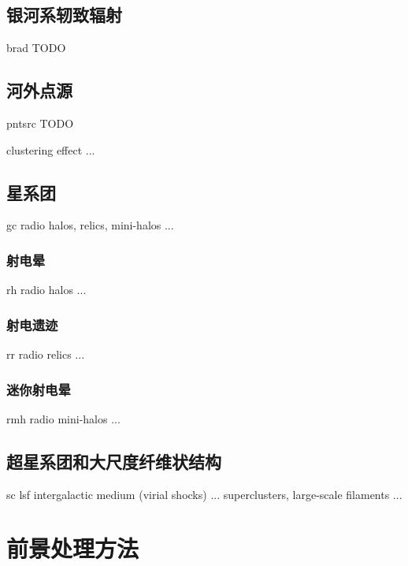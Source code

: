 \subsection{银河系轫致辐射}

\acl{brad}
TODO

\subsection{河外点源}

\acl{pntsrc}
TODO

clustering effect ...

\subsection{星系团}

\acl{gc}
radio halos, relics, mini-halos ...

\subsubsection{射电晕}

\acl{rh}
radio halos ...

\subsubsection{射电遗迹}

\acl{rr}
radio relics ...

\subsubsection{迷你射电晕}

\acl{rmh}
radio mini-halos ...

\subsection{超星系团和大尺度纤维状结构}

\acl{sc}
\acl{lsf}
intergalactic medium (virial shocks) ...
superclusters, large-scale filaments ...


\section{前景处理方法}
\label{sec:fg-methods}

